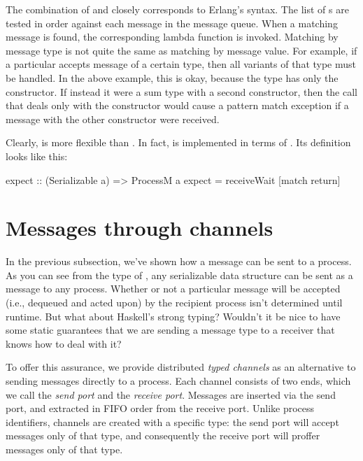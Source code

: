 \documentclass[preprint]{sigplanconf}
\begin{document}
The combination of  and  closely corresponds to Erlang's  syntax. The list of s are tested in order against each message in the message queue. When a matching message is found, the corresponding lambda function is invoked. 
Matching by message type is not quite the same as matching by message value. For example, if a particular  accepts message of a certain type, then all variants of that type must be handled. In the above example, this is okay, because the  type has only the  constructor. 
If instead it were a sum type with a second constructor, then the  call that deals only with the  constructor would cause a pattern match exception if a message with the other constructor were received.

Clearly,  is more flexible than . In fact,  is implemented in terms of . Its definition looks like this:

\begin{code}
expect :: (Serializable a) => ProcessM a
expect = receiveWait [match return]
\end{code}

\section{Messages through channels}
In the previous subsection, we've shown how a message can be sent to a process. As you can see from the type of , any serializable data structure can be sent as a message to any process. Whether or not a particular message will be accepted (i.e., dequeued and acted upon) by the recipient process isn't determined until runtime. But what about Haskell's strong typing? Wouldn't it be nice to have some static guarantees that we are sending a message type to a receiver that knows how to deal with it?

To offer this assurance, we provide distributed {\em typed channels} as an alternative to sending messages directly to a process. Each channel consists of two ends, which we call the {\em send port} and the {\em receive port}. Messages are inserted via the send port, and extracted in FIFO order from the receive port. Unlike process identifiers, channels are created with a specific type: the send port will accept messages only of that type, and consequently the receive port will proffer messages only of that type.
\end{document}
